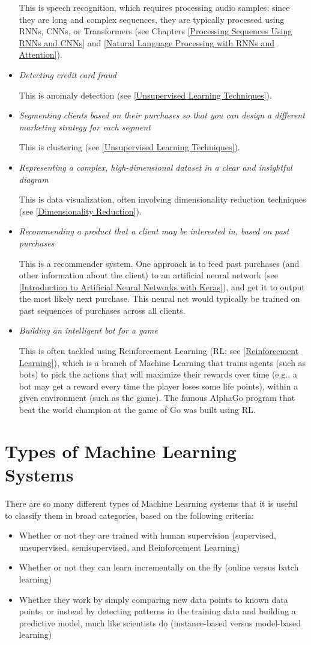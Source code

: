 \begin{itemize}
This is speech recognition, which requires processing audio samples: since they
are long and complex sequences, they are typically processed using RNNs, CNNs,
or Transformers (see Chapters \ref{Processing Sequences Using
RNNs and CNNs} and \ref{Natural Language Processing with
RNNs and Attention}).
\item
\emph{Detecting credit card fraud}

This is anomaly detection (see \autoref{Unsupervised Learning Techniques}).
\item
\emph{Segmenting clients based on their purchases so that you can design a different marketing
strategy for each segment}

This is clustering (see \autoref{Unsupervised Learning Techniques}).
\item
\emph{Representing a complex, high-dimensional dataset in a clear and insightful diagram}

This is data visualization, often involving dimensionality reduction techniques
(see \autoref{Dimensionality Reduction}).
\item
\emph{Recommending a product that a client may be interested in, based on past purchases}

This is a recommender system. One approach is to feed past purchases (and
other information about the client) to an artificial neural network (see \autoref{Introduction to Artificial Neural Networks
with Keras}), and get it to output the most likely next purchase. This neural net would
typically be trained on past sequences of purchases across all clients.
\item
\emph{Building an intelligent bot for a game}

This is often tackled using Reinforcement Learning (RL; see \autoref{Reinforcement Learning}), which
is a branch of Machine Learning that trains agents (such as bots) to pick the
actions that will maximize their rewards over time (e.g., a bot may get a reward
every time the player loses some life points), within a given environment (such as
the game). The famous AlphaGo program that beat the world champion at the
game of Go was built using RL.
\end{itemize}

\section{Types of Machine Learning Systems}
There are so many different types of Machine Learning systems that it is useful to
classify them in broad categories, based on the following criteria:
\begin{itemize}
\item Whether or not they are trained with human supervision (supervised, unsupervised, semisupervised, and Reinforcement Learning)
\item Whether or not they can learn incrementally on the fly (online versus batch
learning)
\item Whether they work by simply comparing new data points to known data points,
or instead by detecting patterns in the training data and building a predictive
model, much like scientists do (instance-based versus model-based learning)
\end{itemize}

